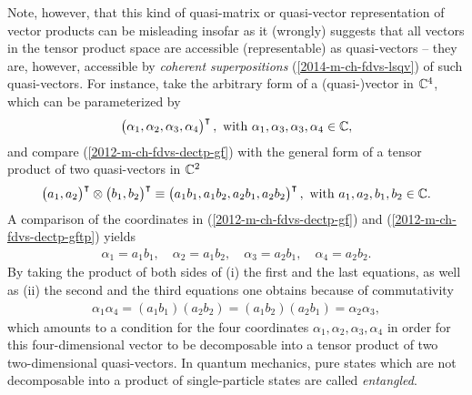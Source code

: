 Note, however, that this kind of quasi-matrix or quasi-vector representation of vector products
can be misleading insofar as
it (wrongly) suggests that all vectors in the tensor product space are accessible (representable) as quasi-vectors
-- they are, however, accessible by {\em coherent superpositions} (\ref{2014-m-ch-fdvs-lsqv})
of such quasi-vectors. \label{2012-m-c-fdvs-entanglement}
For instance, take the arbitrary form of a (quasi-)vector in ${\Bbb C}^4$, which can be parameterized by
\begin{equation}
\begin{pmatrix}\alpha_1,\alpha_2,\alpha_3,\alpha_4\end{pmatrix}^\intercal , \textrm{ with } \alpha_1,\alpha_3,\alpha_3,\alpha_4 \in {\Bbb C},
\label{2012-m-ch-fdvs-dectp-gf}
\end{equation}
and compare (\ref{2012-m-ch-fdvs-dectp-gf}) with the general form of a tensor product of two quasi-vectors in  ${\Bbb C}^2$
\begin{equation}
\begin{pmatrix}a_1,a_2\end{pmatrix}^\intercal \otimes \begin{pmatrix}b_1,b_2\end{pmatrix}^\intercal
\equiv \begin{pmatrix}a_1b_1, a_1 b_2,a_2b_1,a_2b_2\end{pmatrix}^\intercal , \textrm{ with } a_1,a_2,b_1,b_2\in {\Bbb C}.
\label{2012-m-ch-fdvs-dectp-gftp}
\end{equation}
A comparison of the coordinates in
(\ref{2012-m-ch-fdvs-dectp-gf})
and
(\ref{2012-m-ch-fdvs-dectp-gftp})
yields
\begin{equation}
\begin{split}
\alpha_1=a_1b_1,\quad
\alpha_2=a_1b_2,\quad
\alpha_3=a_2b_1,\quad
\alpha_4=a_2b_2.
\end{split}
\label{2012-m-ch-fdvs-dectp-gftp-a}
\end{equation}
By taking the product of both sides of (i) the first and the last
equations, as well as (ii) the second and the third equations
one obtains because of commutativity
\begin{equation}
\begin{split}
{\alpha_1}{\alpha_4}= (a_1b_1) (a_2b_2) = (a_1b_2) (a_2b_1)
={\alpha_2}{\alpha_3},
\end{split}
\label{2012-m-ch-fdvs-dectp-gftp-fr}
\end{equation}
which amounts to a condition for the four coordinates  $\alpha_1,\alpha_2,\alpha_3,\alpha_4$
in order for this four-dimensional vector to be decomposable into a tensor product of two two-dimensional quasi-vectors.
In quantum mechanics, pure states which are not decomposable into a  product of single-particle states
are called {\em entangled}.


